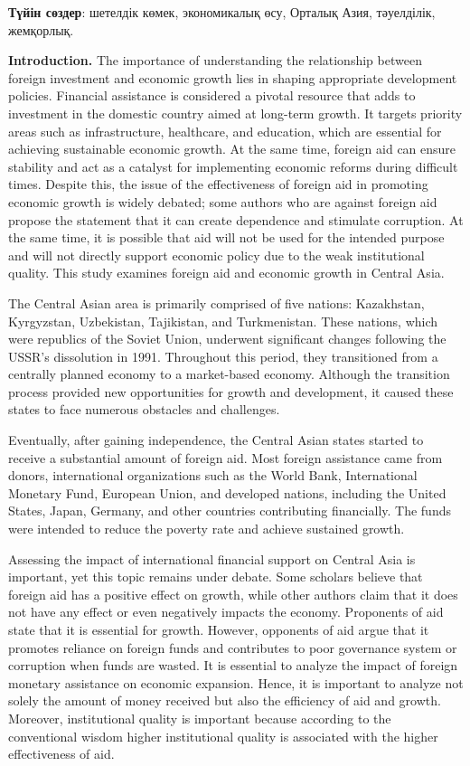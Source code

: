 {\bfseries Түйін сөздер}: шетелдік көмек, экономикалық өсу, Орталық Азия,
тәуелділік, жемқорлық.

\begin{multicols}{2}
{\bfseries Introduction.} The importance of understanding the relationship
between foreign investment and economic growth lies in shaping
appropriate development policies. Financial assistance is considered a
pivotal resource that adds to investment in the domestic country aimed
at long-term growth. It targets priority areas such as infrastructure,
healthcare, and education, which are essential for achieving sustainable
economic growth. At the same time, foreign aid can ensure stability and
act as a catalyst for implementing economic reforms during difficult
times. Despite this, the issue of the effectiveness of foreign aid in
promoting economic growth is widely debated; some authors who are
against foreign aid propose the statement that it can create dependence
and stimulate corruption. At the same time, it is possible that aid will
not be used for the intended purpose and will not directly support
economic policy due to the weak institutional quality. This study
examines foreign aid and economic growth in Central Asia.~

The Central Asian area is primarily comprised of five nations:
Kazakhstan, Kyrgyzstan, Uzbekistan, Tajikistan, and Turkmenistan. These
nations, which were republics of the Soviet Union, underwent significant
changes following the USSR's dissolution in 1991. Throughout this
period, they transitioned from a centrally planned economy to a
market-based economy. Although the transition process provided new
opportunities for growth and development, it caused these states to face
numerous obstacles and challenges.

Eventually, after gaining independence, the Central Asian states started
to receive a substantial amount of foreign aid. Most foreign assistance
came from donors, international organizations such as the World Bank,
International Monetary Fund, European Union, and developed nations,
including the United States, Japan, Germany, and other countries
contributing financially. The funds were intended to reduce the poverty
rate and achieve sustained growth.

Assessing the impact of international financial support on Central Asia
is important, yet this topic remains under debate. Some scholars believe
that foreign aid has a positive effect on growth, while other authors
claim that it does not have any effect or even negatively impacts the
economy. Proponents of aid state that it is essential for growth.
However, opponents of aid argue that it promotes reliance on foreign
funds and contributes to poor governance system or corruption when funds
are wasted. It is essential to analyze the impact of foreign monetary
assistance on economic expansion. Hence, it is important to analyze not
solely the amount of money received but also the efficiency of aid and
growth. Moreover, institutional quality is important because according
to the conventional wisdom higher institutional quality is associated
with the higher effectiveness of aid.


\end{multicols}
